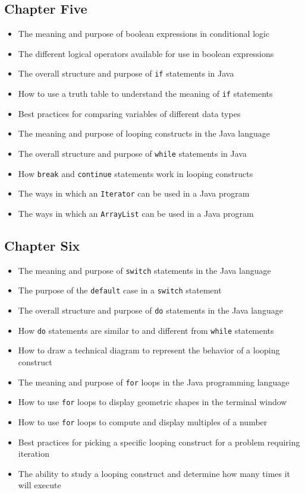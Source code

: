 \documentclass[11pt]{article}
\begin{document}
\subsection*{Chapter Five}

\begin{itemize}

  \item The meaning and purpose of boolean expressions in conditional logic
  \item The different logical operators available for use in boolean expressions
  \item The overall structure and purpose of {\tt if} statements in Java
  \item How to use a truth table to understand the meaning of {\tt if} statements
  \item Best practices for comparing variables of different data types
  \item The meaning and purpose of looping constructs in the Java language
  \item The overall structure and purpose of {\tt while} statements in Java
  \item How {\tt break} and {\tt continue} statements work in looping constructs
  \item The ways in which an {\tt Iterator} can be used in a Java program
  \item The ways in which an {\tt ArrayList} can be used in a Java program

\end{itemize}

\subsection*{Chapter Six}

\begin{itemize}

  \item The meaning and purpose of {\tt switch} statements in the Java language
  \item The purpose of the {\tt default} case in a {\tt switch} statement
  \item The overall structure and purpose of {\tt do} statements in the Java language
  \item How {\tt do} statements are similar to and different from {\tt while} statements
  \item How to draw a technical diagram to represent the behavior of a looping construct
  \item The meaning and purpose of {\tt for} loops in the Java programming language
  \item How to use {\tt for} loops to display geometric shapes in the terminal window
  \item How to use {\tt for} loops to compute and display multiples of a number
  \item Best practices for picking a specific looping construct for a problem requiring iteration
  \item The ability to study a looping construct and determine how many times it will execute

\end{itemize}
\end{document}
